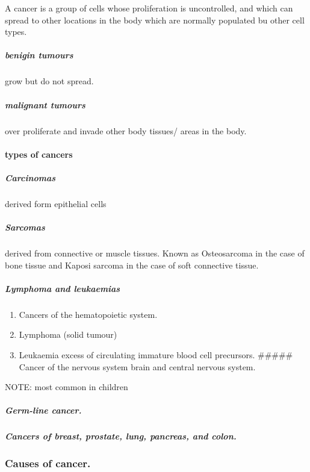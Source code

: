 \documentclass[]{article}
\providecommand{\tightlist}{%
  \setlength{\itemsep}{0pt}\setlength{\parskip}{0pt}}
\let\oldparagraph\paragraph
\renewcommand{\paragraph}[1]{\oldparagraph{#1}\mbox{}}
\let\oldsubparagraph\subparagraph
\renewcommand{\subparagraph}[1]{\oldsubparagraph{#1}\mbox{}}
\begin{document}
A cancer is a group of cells whose proliferation is uncontrolled, and
which can spread to other locations in the body which are normally
populated bu other cell types.

\hypertarget{benigin-tumours-1}{%
\subparagraph{benigin tumours}\label{benigin-tumours-1}}

grow but do not spread.

\hypertarget{malignant-tumours-1}{%
\subparagraph{malignant tumours}\label{malignant-tumours-1}}

over proliferate and invade other body tissues/ areas in the body.

\hypertarget{types-of-cancers-1}{%
\paragraph{types of cancers}\label{types-of-cancers-1}}

\hypertarget{carcinomas-1}{%
\subparagraph{Carcinomas}\label{carcinomas-1}}

derived form epithelial cells

\hypertarget{sarcomas-1}{%
\subparagraph{Sarcomas}\label{sarcomas-1}}

derived from connective or muscle tissues. Known as Osteosarcoma in the
case of bone tissue and Kaposi sarcoma in the case of soft connective
tissue.

\hypertarget{lymphoma-and-leukaemias-1}{%
\subparagraph{Lymphoma and leukaemias}\label{lymphoma-and-leukaemias-1}}

\begin{enumerate}
\def\labelenumi{\arabic{enumi}.}
\tightlist
\item
  Cancers of the hematopoietic system.
\item
  Lymphoma (solid tumour)
\item
  Leukaemia excess of circulating immature blood cell precursors.
  \#\#\#\#\# Cancer of the nervous system brain and central nervous
  system.
\end{enumerate}

NOTE: most common in children

\hypertarget{germ-line-cancer.-1}{%
\subparagraph{Germ-line cancer.}\label{germ-line-cancer.-1}}

\hypertarget{cancers-of-breast-prostate-lung-pancreas-and-colon.-1}{%
\subparagraph{Cancers of breast, prostate, lung, pancreas, and
colon.}\label{cancers-of-breast-prostate-lung-pancreas-and-colon.-1}}

\hypertarget{causes-of-cancer.-1}{%
\subsubsection{Causes of cancer.}\label{causes-of-cancer.-1}}
\end{document}
